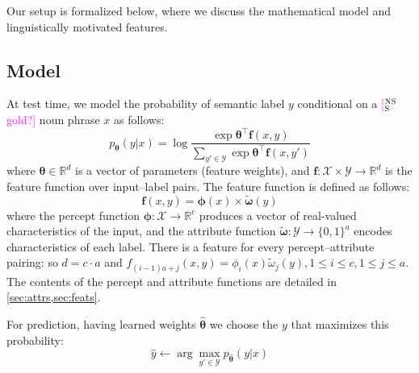 \documentclass[11pt,letterpaper]{article}
\newcommand{\ensuretext}[1]{#1}
\newcommand{\nssmarker}{\ensuretext{\textcolor{magenta}{\ensuremath{^{\textsc{NS}}_{\textsc{S}}}}}}
\newcommand{\arkcomment}[3]{\ensuretext{\textcolor{#3}{[#1 #2]}}}
\newcommand{\nss}[1]{\arkcomment{\nssmarker}{#1}{magenta}}
\begin{document}
Our setup is formalized below, where we discuss the mathematical model and linguistically motivated features.

\subsection{Model}

At test time, we model the probability of semantic label $y$ 
conditional on a \nss{gold?} noun phrase $x$ as follows:
\begin{equation}
p_{\boldsymbol{\theta}}(y | x) = \log{\frac{\exp{\boldsymbol{\theta}^{\top}\mathbf{f}(x,y)}}{\sum_{y' \in \mathcal{Y}}\exp{\boldsymbol{\theta}^{\top}\mathbf{f}(x,y')}}}
\end{equation}
where $\boldsymbol{\theta} \in \mathbb{R}^d$ is a vector of parameters (feature weights), and 
$\mathbf{f}: \mathcal{X} \times \mathcal{Y} \rightarrow \mathbb{R}^d$ is the feature function over input--label pairs.
The feature function is defined as follows:
\begin{equation}
\mathbf{f}(x,y) = \boldsymbol{\phi}(x) \times \tilde{\boldsymbol{\omega}}(y)
\end{equation}
where the percept function $\boldsymbol{\phi}: \mathcal{X} \rightarrow \mathbb{R}^c$ 
produces a vector of real-valued characteristics of the input, and  
the attribute function $\tilde{\boldsymbol{\omega}}: \mathcal{Y} \rightarrow \{0,1\}^a$
encodes characteristics of each label.
There is a feature for every percept--attribute pairing: so
$d = c \cdot a$ and $f_{(i-1)a+j}(x,y) = \phi_i(x)\tilde{\omega}_j(y), 1 \leq i \leq c, 1 \leq j \leq a$.
The contents of the percept and attribute functions are detailed in \cref{sec:attrs,sec:feats}.

For prediction, having learned weights $\hat{\boldsymbol{\theta}}$ we choose the $y$ that maximizes this probability:
\begin{equation}
\hat{y} \leftarrow \arg\max_{y' \in \mathcal{Y}} p_{\hat{\boldsymbol{\theta}}}(y | x)
\end{equation}
\end{document}
